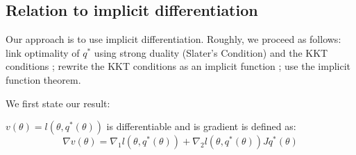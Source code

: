 \subsection{Relation to implicit differentiation}\label{sec:lagrangian}
Our approach is to use implicit differentiation. Roughly, we proceed as follows: link optimality of $q^*$ using strong duality (Slater's Condition) and the KKT conditions ; rewrite the KKT conditions as an implicit function ; use the implicit function theorem.

\noindent We first state our result:

\begin{theorem}
$v(\theta) = l(\theta, q^*(\theta))$ is differentiable and is gradient is defined as:
\begin{equation}
    \nabla v(\theta) = \nabla_1 l(\theta, q^*(\theta)) + \nabla_2 l(\theta, q^*(\theta))J q^*(\theta)
\end{equation}
\end{theorem}

